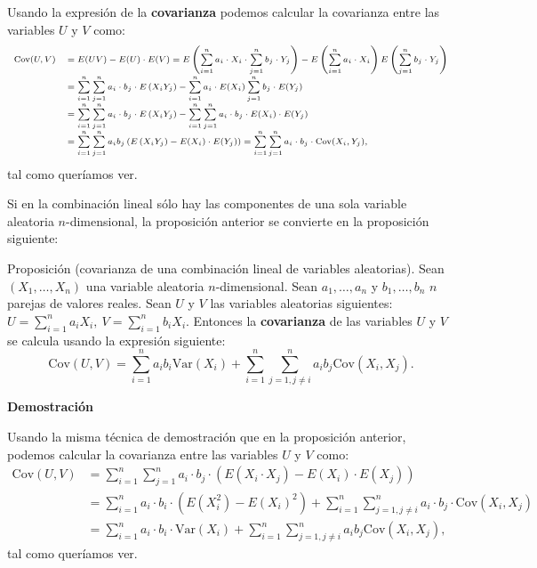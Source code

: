 \documentclass[
  letterpaper,
  DIV=11,
  numbers=noendperiod]{scrreprt}
\begin{document}
Usando la expresión de la \textbf{covarianza} podemos calcular la
covarianza entre las variables \(U\) y \(V\) como: \[
\scriptsize{
\begin{array}{rl}
\mathrm{Cov}(U,V) & =E(UV)-E(U)\cdot E(V)=E\left(\sum\limits_{i=1}^n a_i \cdot X_i\cdot \sum\limits_{j=1}^n b_j \cdot Y_j\right)- E\left(\sum\limits_{i=1}^n a_i \cdot X_i\right)E\left(\sum\limits_{j=1}^n b_j \cdot Y_j\right) \\ & =\sum\limits_{i=1}^n \sum\limits_{j=1}^n a_i\cdot  b_j \cdot E\left(X_i Y_j\right)-\sum\limits_{i=1}^n a_i\cdot  E(X_i)\sum\limits_{j=1}^n b_j \cdot E(Y_j) \\
&= \sum\limits_{i=1}^n \sum\limits_{j=1}^n a_i\cdot  b_j\cdot E\left(X_i Y_j\right)-\sum\limits_{i=1}^n\sum\limits_{j=1}^n a_i\cdot  b_j\cdot  E(X_i)\cdot  E(Y_j) \\ & = \sum\limits_{i=1}^n \sum\limits_{j=1}^n a_i b_j \left(E\left(X_i Y_j\right) - E(X_i)\cdot  E(Y_j)\right) = \sum\limits_{i=1}^n \sum\limits_{j=1}^n a_i\cdot  b_j\cdot  \mathrm{Cov}(X_i,Y_j),
\end{array}}
\] tal como queríamos ver.

Si en la combinación lineal sólo hay las componentes de una sola
variable aleatoria \(n\)-dimensional, la proposición anterior se
convierte en la proposición siguiente:

Proposición (covarianza de una combinación lineal de variables
aleatorias). Sean \((X_1,\ldots,X_n)\) una variable aleatoria
\(n\)-dimensional. Sean \(a_1, \ldots, a_n\) y \(b_1,\ldots, b_n\) \(n\)
parejas de valores reales. Sean \(U\) y \(V\) las variables aleatorias
siguientes:
\(U=\sum\limits_{i=1}^n a_i X_i,\  V=\sum\limits_{i=1}^n b_i X_i.\)
Entonces la \textbf{covarianza} de las variables \(U\) y \(V\) se
calcula usando la expresión siguiente: \[
\mathrm{Cov}(U,V)=\sum_{i=1}^n a_i b_i \mathrm{Var}(X_i)+\sum_{i=1}^n\sum_{j=1,j\neq i}^n a_i b_j \mathrm{Cov}(X_i,X_j).
\]

\textbf{Demostración}

Usando la misma técnica de demostración que en la proposición anterior,
podemos calcular la covarianza entre las variables \(U\) y \(V\) como:
\[
\begin{array}{rl}
\mathrm{Cov}(U,V) & = \sum\limits_{i=1}^n \sum\limits_{j=1}^n a_i\cdot  b_j\cdot  \left(E\left(X_i \cdot X_j\right) - E(X_i)\cdot  E(X_j)\right) \\
&= \sum\limits_{i=1}^n a_i\cdot  b_i \cdot \left(E\left(X_i^2\right) - E(X_i)^2\right)+\sum\limits_{i=1}^n \sum\limits_{j=1,j\neq i}^n a_i \cdot b_j\cdot  \mathrm{Cov}(X_i,X_j) \\ & = \sum\limits_{i=1}^n a_i\cdot  b_i\cdot  \mathrm{Var}(X_i)+\sum\limits_{i=1}^n \sum\limits_{j=1,j\neq i}^n a_i b_j \mathrm{Cov}(X_i,X_j),
\end{array}
\] tal como queríamos ver.
\end{document}
